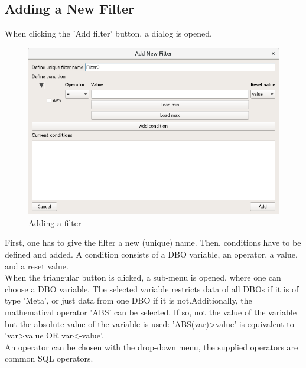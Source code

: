 \documentclass[10pt,letterpaper,extrafontsizes]{memoir}
\begin{document}
\subsection{Adding a New Filter}
When clicking the 'Add filter' button, a dialog is opened.

\begin{figure}[H]
  \center
    \includegraphics[width=14cm,frame]{../screenshots/filter_add.png}
  \caption{Adding a filter}
  \label{fig:filter_add}
\end{figure}

First, one has to give the filter a new (unique) name. Then, conditions have to be defined and added. A condition consists of a DBO variable, an operator, a value, and a reset value. \\

When the triangular button is clicked, a sub-menu is opened, where one can choose a DBO variable. The selected variable restricts data of all DBOs if it is of type 'Meta', or just data from one DBO if it is not.Additionally, the mathematical operator 'ABS' can be selected. If so, not the value of the variable but the absolute value of the variable is used: 'ABS(var)>value' is equivalent to 'var>value OR var<-value'. \\

An operator can be chosen with the drop-down menu, the supplied operators are common SQL operators.
\end{document}
